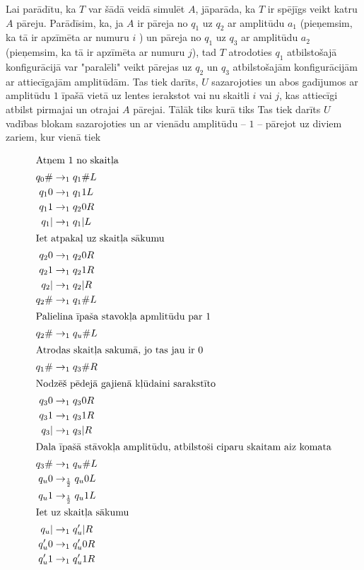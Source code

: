 \documentclass{ludis}
\begin{document}
Lai parādītu, ka $T$ var šādā veidā simulēt $A$, jāparāda, ka $T$ ir spējīgs veikt katru $A$ pāreju. Parādīsim, ka, ja $A$ ir pāreja no $q_1$ uz $q_2$ ar amplitūdu $a_1$ (pieņemsim, ka tā ir apzīmēta ar numuru $i$ ) un pāreja no $q_1$ uz $q_3$ ar amplitūdu $a_2$ (pieņemsim, ka tā ir apzīmēta ar numuru $j$), tad $T$ atrodoties $q_1$ atbilstošajā konfigurācijā var "paralēli" veikt pārejas uz $q_2$ un $q_3$ atbilstošajām konfigurācijām ar attiecīgajām amplitūdām. Tas tiek darīts, $U$ sazarojoties un abos gadījumos ar amplitūdu $1$ īpašā vietā uz lentes ierakstot vai nu skaitli $i$ vai $j$, kas attiecīgi atbilst pirmajai un otrajai $A$ pārejai. Tālāk  tiks  kurā tiks  Tas tiek darīts $U$ vadības blokam sazarojoties un ar vienādu amplitūdu -- $1$ -- pārejot uz diviem zariem, kur vienā tiek 

\begin{multicols}{2}
	\begin{align*}
	\shortintertext{Atņem 1 no skaitļa}
		q_0\# & \rightarrow_1 q_1\#L\\
		q_10 & \rightarrow_1 q_11L\\
		q_11 & \rightarrow_1 q_20R\\
		q_1| & \rightarrow_1 q_1|L\\
	\shortintertext{Iet atpakaļ uz skaitļa sākumu}
		q_20 & \rightarrow_1 q_20R\\
		q_21 & \rightarrow_1 q_21R\\
		q_2| & \rightarrow_1 q_2|R\\
		q_2\# & \rightarrow_1 q_1\#L\\
	\shortintertext{Palielina īpaša stavokļa apmlitūdu par 1}
		q_2\# & \rightarrow_1 q_u\#L\\
	\shortintertext{Atrodas skaitļa sakumā, jo tas jau ir 0}
		q_1\# & \rightarrow_1 q_3\#R\\
	\shortintertext{Nodzēš pēdejā gajienā kļūdaini sarakstīto}
		q_30 & \rightarrow_1 q_30R\\
		q_31 & \rightarrow_1 q_31R\\
		q_3| & \rightarrow_1 q_3|R\\
	\shortintertext{Dala īpašā stāvokļa amplitūdu, atbilstoši ciparu skaitam aiz komata}
		q_3\# & \rightarrow_1 q_u\#L\\
		q_u0 & \rightarrow_\frac{1}{2} q_u0L\\
		q_u1 & \rightarrow_\frac{1}{2} q_u1L\\
	\shortintertext{Iet uz skaitļa sākumu}
		q_u| & \rightarrow_1 q_u'|R\\
		q_u'0 & \rightarrow_1 q_u'0R\\
		q_u'1 & \rightarrow_1 q_u'1R\\
	\end{align*}
\end{multicols}
\end{document}
